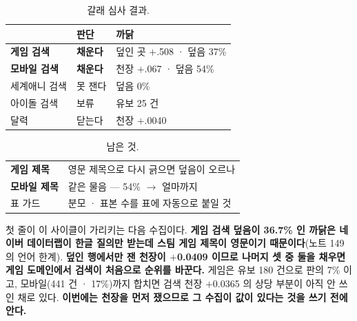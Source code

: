 \documentclass[10pt]{article}
\begin{document}

\begin{table}[t]
\centering\tsize
\caption{갈래 심사 결과.}
\begin{tabular}{lll}
\toprule
& 판단 & 까닭 \\
\midrule
\textbf{게임 검색} & \textbf{채운다} & 덮인 곳 $+$.508 · 덮음 37\% \\
\textbf{모바일 검색} & \textbf{채운다} & 천장 $+$.067 · 덮음 54\% \\
세계애니 검색 & 못 잰다 & 덮음 0\% \\
아이돌 검색 & 보류 & 유보 25 건 \\
달력 & 닫는다 & 천장 $+$.0040 \\
\bottomrule
\end{tabular}
\end{table}

\begin{table}[t]
\centering\tsize
\caption{남은 것.}
\begin{tabular}{ll}
\toprule
\textbf{게임 제목} & 영문 제목으로 다시 긁으면 덮음이 오르나 \\
\textbf{모바일 제목} & 같은 물음 --- 54\% $\to$ 얼마까지 \\
표 가드 & 분모 · 표본 수를 표에 자동으로 붙일 것 \\
\bottomrule
\end{tabular}
\end{table}

첫 줄이 이 사이클이 가리키는 다음 수집이다. \textbf{게임 검색 덮음이
36.7\% 인 까닭은 네이버 데이터랩이 한글 질의만 받는데 스팀 게임 제목이
영문이기 때문이다}(노트 149의 언어 한계). \textbf{덮인 행에서만 잰 천장이 $+$0.0409 이므로
나머지 셋 중 둘을 채우면 게임 도메인에서 검색이 처음으로 순위를 바꾼다.} 게임은 유보 180 건으로 판의 7\% 이고, 모바일(441 건 ·
17\%)까지 합치면 검색 천장 $+$0.0365 의 상당 부분이 아직 안 쓰인 채로
있다. \textbf{이번에는 천장을 먼저 쟀으므로 그 수집이 값이 있다는 것을
쓰기 전에 안다.}
\end{document}
